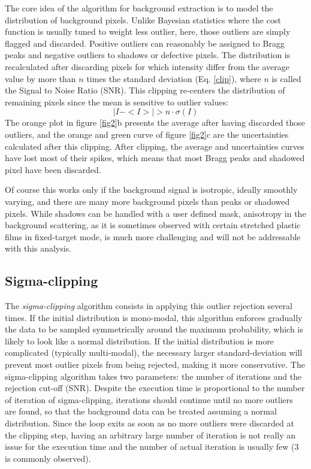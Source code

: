 \documentclass[preprint]{iucr}              %
\begin{document}
The core idea of the algorithm for background extraction is to model the distribution of background pixels. Unlike Bayesian statistics \cite{Sivia2006} where the cost function is usually tuned to weight less outlier, here, those outliers are simply flagged and discarded.
Positive outliers can reasonably be assigned to Bragg peaks and negative outliers to shadows or defective pixels. 
The distribution is recalculated  after discarding pixels for which intensity differ from the average value by more than $n$ times the standard deviation (Eq. \ref{clip}), where $n$ is called the Signal to Noise Ratio (SNR).
This clipping re-centers the distribution of remaining pixels since the mean is sensitive to outlier values:
\begin{equation}
\label{clip}
|I - <I>| > n \cdot \sigma(I)
\end{equation}
The orange plot in figure \ref{fig2}b presents the average after having discarded those outliers, and the orange and green curve of figure \ref{fig2}c are the uncertainties calculated after this clipping. 
After clipping, the average and uncertainties curves have lost most of their spikes, which means that most Bragg peaks and shadowed pixel have been discarded.

Of course this works only if the background signal is isotropic, ideally smoothly varying, and there are many more background pixels than peaks or shadowed pixels. 
While shadows can be handled with a user defined mask, anisotropy in the background scattering, as it is sometimes observed with certain stretched plastic films in fixed-target mode, is much more challenging and will not be addressable with this analysis.   

\subsection{Sigma-clipping}
The \textit{sigma-clipping} algorithm consists in applying this outlier rejection several times.
If the initial distribution is mono-modal, this algorithm enforces gradually the data to be sampled symmetrically around the maximum probability, which is likely to look like a normal distribution.
If the initial distribution is more complicated (typically multi-modal), the necessary larger standard-deviation will prevent most outlier pixels from being rejected, making it more conservative.
The sigma-clipping algorithm takes two parameters: the number of iterations and the rejection cut-off (SNR).
Despite the execution time is proportional to the number of iteration of sigma-clipping, iterations should continue until no more outliers are found, so that the background data can be treated assuming a normal distribution. 
Since the loop exits as soon as no more outliers were discarded at the clipping step, having an arbitrary large number of iteration is not really an issue for the execution time and the number of actual iteration is usually few (3 is commonly observed).       
\end{document}
